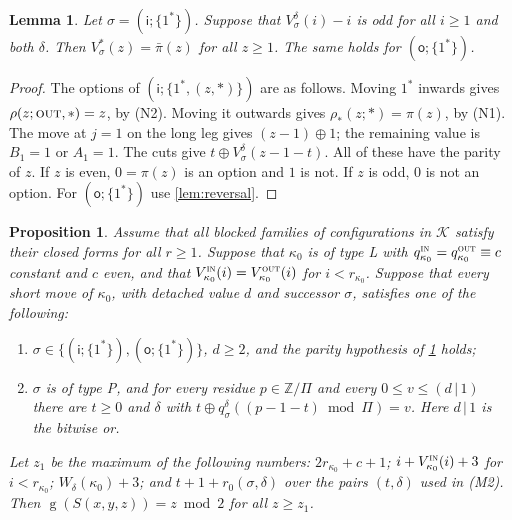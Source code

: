 \documentclass[11pt]{amsart}
\newtheorem{lemma}[theorem]{Lemma}
\newtheorem{proposition}[theorem]{Proposition}
\theoremstyle{definition}
\theoremstyle{remark}
\newcommand{\gv}{\operatorname{g}}           %
\newcommand{\si}{\mathsf{i}}
\newcommand{\so}{\mathsf{o}}
\newcommand{\Sp}{S}
\newcommand{\free}{\ast}
\newcommand{\IN}{\textup{\textsc{in}}}
\newcommand{\OUT}{\textup{\textsc{out}}}
\begin{document}
\begin{lemma}\label{lem:F1}
Let $\sigma=(\si;\{1^\free\})$. Suppose that $V^\delta_\sigma(i)-i$ is odd for all $i\ge1$ and both $\delta$. Then $V^\free_\sigma(z)=\bar\pi(z)$ for all $z\ge1$. The same holds for $(\so;\{1^\free\})$.
\end{lemma}

\begin{proof}
The options of $(\si;\{1^\free,(z,\free)\})$ are as follows. Moving $1^\free$ inwards gives $\rho(z;\OUT,\free)=z$, by (N2). Moving it outwards gives $\rho_\free(z;\free)=\pi(z)$, by (N1). The move at $j=1$ on the long leg gives $(z-1)\oplus1$; the remaining value is $B_1=1$ or $A_1=1$. The cuts give $t\oplus V^\delta_\sigma(z-1-t)$. All of these have the parity of $z$. If $z$ is even, $0=\pi(z)$ is an option and $1$ is not. If $z$ is odd, $0$ is not an option. For $(\so;\{1^\free\})$ use \cref{lem:reversal}.
\end{proof}

\begin{proposition}\label{prop:certM}
Assume that all blocked families of configurations in $\mathcal K$ satisfy their closed forms for all $r\ge1$. Suppose that $\kappa_0$ is of type L with $q^\IN_{\kappa_0}=q^\OUT_{\kappa_0}\equiv c$ constant and $c$ even, and that $V^\IN_{\kappa_0}(i)=V^\OUT_{\kappa_0}(i)$ for $i<r_{\kappa_0}$. Suppose that every short move of $\kappa_0$, with detached value $d$ and successor $\sigma$, satisfies one of the following:
\begin{enumerate}[label=\textup{(M\arabic*)},leftmargin=*]
\item $\sigma\in\{(\si;\{1^\free\}),(\so;\{1^\free\})\}$, $d\ge2$, and the parity hypothesis of \cref{lem:F1} holds;
\item $\sigma$ is of type P, and for every residue $p\in\mathbb Z/\Pi$ and every $0\le v\le (d\,|\,1)$ there are $t\ge0$ and $\delta$ with $t\oplus q^\delta_\sigma((p-1-t)\bmod\Pi)=v$. Here $d\,|\,1$ is the bitwise or.
\end{enumerate}
Let $z_1$ be the maximum of the following numbers: $2r_{\kappa_0}+c+1$; $i+V^\IN_{\kappa_0}(i)+3$ for $i<r_{\kappa_0}$; $W_\delta(\kappa_0)+3$; and $t+1+r_0(\sigma,\delta)$ over the pairs $(t,\delta)$ used in (M2). Then $\gv(\Sp(x,y,z))=z\bmod2$ for all $z\ge z_1$.
\end{proposition}
\end{document}
